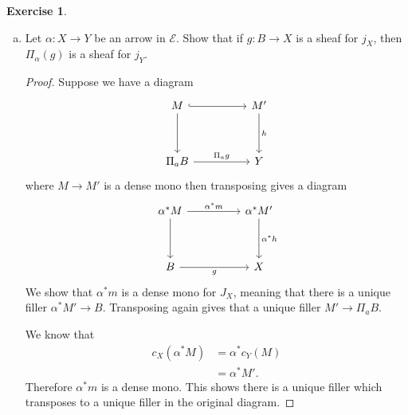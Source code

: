 \documentclass{article}
\newcommand{\topos}{\mathcal{E}}
\theoremstyle{definition}
\newtheorem{question}{Exercise}
\begin{document}
\begin{question}
\begin{enumerate}[(a)]
        \item Let \(\alpha:X\to Y\) be an arrow in \(\topos\). Show that if
              \(g:B\to X\) is a sheaf for \(j_{X}\), then \(\Pi_{\alpha}(g)\) is
              a sheaf for \(j_{Y}\).

              \begin{proof}
                  Suppose we have a diagram
                  \[
                      \begin{tikzcd}[ampersand replacement=\&]
                          M \&\& {M'} \\
                          \\
                          {\Pi_{a}B} \&\& Y
                          \arrow[hook, from=1-1, to=1-3]
                          \arrow[from=1-1, to=3-1]
                          \arrow["{\Pi_{a}g}", from=3-1, to=3-3]
                          \arrow["h", from=1-3, to=3-3]
                      \end{tikzcd}
                  \]
                  where \(M\to M'\) is a dense mono then transposing gives a
                  diagram
                  \[
                      \begin{tikzcd}[ampersand replacement=\&]
                          {\alpha^{*}M} \&\& {\alpha^{*}M'} \\
                          \\
                          B \&\& X
                          \arrow["{\alpha^{*}m}", from=1-1, to=1-3]
                          \arrow[from=1-1, to=3-1]
                          \arrow["g"', from=3-1, to=3-3]
                          \arrow["{\alpha^{*}h}", from=1-3, to=3-3]
                      \end{tikzcd}
                  \]
                  We show that \(\alpha^{*}m\) is a dense mono for \(J_{X}\),
                  meaning that there is a unique filler \(\alpha^{*}M'\to B\).
                  Transposing again gives that a unique filler \(M'\to
                  \Pi_{a}B\).

                  We know that
                  \begin{align*}
                      c_{X}(\alpha^{*}M) & =\alpha^{*}c_{Y}(M) \\
                                         & =\alpha^{*}M'.
                  \end{align*}
                  Therefore \(\alpha^{*}m\) is a dense mono. This shows there is
                  a unique filler which transposes to a unique filler in the
                  original diagram.
              \end{proof}
    \end{enumerate}
\end{question}
\end{document}
